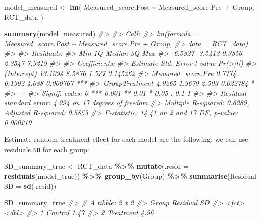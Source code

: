\documentclass[
]{book}
\newenvironment{Shaded}{\begin{snugshade}}{\end{snugshade}}
\newcommand{\CommentTok}[1]{\textcolor[rgb]{0.56,0.35,0.01}{\textit{#1}}}
\newcommand{\DataTypeTok}[1]{\textcolor[rgb]{0.13,0.29,0.53}{#1}}
\newcommand{\KeywordTok}[1]{\textcolor[rgb]{0.13,0.29,0.53}{\textbf{#1}}}
\newcommand{\NormalTok}[1]{#1}
\newcommand{\OperatorTok}[1]{\textcolor[rgb]{0.81,0.36,0.00}{\textbf{#1}}}
\newcommand{\StringTok}[1]{\textcolor[rgb]{0.31,0.60,0.02}{#1}}
\begin{document}
\begin{Shaded}
\begin{Highlighting}[]
\NormalTok{model\_measured <{-}}\StringTok{ }\KeywordTok{lm}\NormalTok{(}
\NormalTok{  Measured\_score.Post }\OperatorTok{\textasciitilde{}}\StringTok{ }\NormalTok{Measured\_score.Pre }\OperatorTok{+}\StringTok{ }\NormalTok{Group,}
\NormalTok{  RCT\_data}
\NormalTok{)}

\KeywordTok{summary}\NormalTok{(model\_measured)}
\CommentTok{\#> }
\CommentTok{\#> Call:}
\CommentTok{\#> lm(formula = Measured\_score.Post \textasciitilde{} Measured\_score.Pre + Group, }
\CommentTok{\#>     data = RCT\_data)}
\CommentTok{\#> }
\CommentTok{\#> Residuals:}
\CommentTok{\#>     Min      1Q  Median      3Q     Max }
\CommentTok{\#> {-}6.5827 {-}3.5413  0.3856  2.3547  7.9219 }
\CommentTok{\#> }
\CommentTok{\#> Coefficients:}
\CommentTok{\#>                    Estimate Std. Error t value Pr(>|t|)    }
\CommentTok{\#> (Intercept)         13.1094     8.5876   1.527 0.145262    }
\CommentTok{\#> Measured\_score.Pre   0.7774     0.1902   4.088 0.000767 ***}
\CommentTok{\#> GroupTreatment       4.9265     1.9679   2.503 0.022784 *  }
\CommentTok{\#> {-}{-}{-}}
\CommentTok{\#> Signif. codes:  0 \textquotesingle{}***\textquotesingle{} 0.001 \textquotesingle{}**\textquotesingle{} 0.01 \textquotesingle{}*\textquotesingle{} 0.05 \textquotesingle{}.\textquotesingle{} 0.1 \textquotesingle{} \textquotesingle{} 1}
\CommentTok{\#> }
\CommentTok{\#> Residual standard error: 4.294 on 17 degrees of freedom}
\CommentTok{\#> Multiple R{-}squared:  0.6289,	Adjusted R{-}squared:  0.5853 }
\CommentTok{\#> F{-}statistic: 14.41 on 2 and 17 DF,  p{-}value: 0.000219}
\end{Highlighting}
\end{Shaded}

Estimate random treatment effect for each model are the following, we can use residuals \texttt{SD} for each group:

\begin{Shaded}
\begin{Highlighting}[]
\NormalTok{SD\_summary\_true <{-}}\StringTok{ }\NormalTok{RCT\_data }\OperatorTok{\%>\%}
\StringTok{  }\KeywordTok{mutate}\NormalTok{(}\DataTypeTok{.resid =} \KeywordTok{residuals}\NormalTok{(model\_true)) }\OperatorTok{\%>\%}
\StringTok{  }\KeywordTok{group\_by}\NormalTok{(Group) }\OperatorTok{\%>\%}
\StringTok{  }\KeywordTok{summarise}\NormalTok{(}\StringTok{\textasciigrave{}}\DataTypeTok{Residual SD}\StringTok{\textasciigrave{}}\NormalTok{ =}\StringTok{ }\KeywordTok{sd}\NormalTok{(.resid))}

\NormalTok{SD\_summary\_true}
\CommentTok{\#> \# A tibble: 2 x 2}
\CommentTok{\#>   Group     \textasciigrave{}Residual SD\textasciigrave{}}
\CommentTok{\#>   <fct>             <dbl>}
\CommentTok{\#> 1 Control            1.47}
\CommentTok{\#> 2 Treatment          4.96}
\end{Highlighting}
\end{Shaded}
\end{document}
